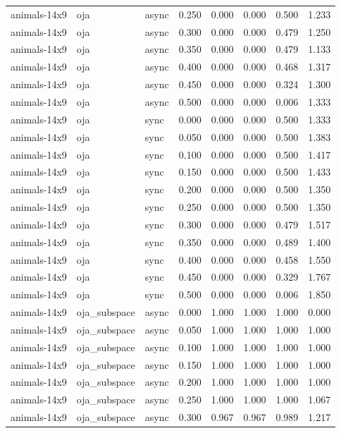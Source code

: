 \begin{tabular}{lllrrrrr}
animals-14x9 & oja & async & 0.250 & 0.000 & 0.000 & 0.500 & 1.233 \\
animals-14x9 & oja & async & 0.300 & 0.000 & 0.000 & 0.479 & 1.250 \\
animals-14x9 & oja & async & 0.350 & 0.000 & 0.000 & 0.479 & 1.133 \\
animals-14x9 & oja & async & 0.400 & 0.000 & 0.000 & 0.468 & 1.317 \\
animals-14x9 & oja & async & 0.450 & 0.000 & 0.000 & 0.324 & 1.300 \\
animals-14x9 & oja & async & 0.500 & 0.000 & 0.000 & 0.006 & 1.333 \\
animals-14x9 & oja & sync & 0.000 & 0.000 & 0.000 & 0.500 & 1.333 \\
animals-14x9 & oja & sync & 0.050 & 0.000 & 0.000 & 0.500 & 1.383 \\
animals-14x9 & oja & sync & 0.100 & 0.000 & 0.000 & 0.500 & 1.417 \\
animals-14x9 & oja & sync & 0.150 & 0.000 & 0.000 & 0.500 & 1.433 \\
animals-14x9 & oja & sync & 0.200 & 0.000 & 0.000 & 0.500 & 1.350 \\
animals-14x9 & oja & sync & 0.250 & 0.000 & 0.000 & 0.500 & 1.350 \\
animals-14x9 & oja & sync & 0.300 & 0.000 & 0.000 & 0.479 & 1.517 \\
animals-14x9 & oja & sync & 0.350 & 0.000 & 0.000 & 0.489 & 1.400 \\
animals-14x9 & oja & sync & 0.400 & 0.000 & 0.000 & 0.458 & 1.550 \\
animals-14x9 & oja & sync & 0.450 & 0.000 & 0.000 & 0.329 & 1.767 \\
animals-14x9 & oja & sync & 0.500 & 0.000 & 0.000 & 0.006 & 1.850 \\
animals-14x9 & oja\_subspace & async & 0.000 & 1.000 & 1.000 & 1.000 & 0.000 \\
animals-14x9 & oja\_subspace & async & 0.050 & 1.000 & 1.000 & 1.000 & 1.000 \\
animals-14x9 & oja\_subspace & async & 0.100 & 1.000 & 1.000 & 1.000 & 1.000 \\
animals-14x9 & oja\_subspace & async & 0.150 & 1.000 & 1.000 & 1.000 & 1.000 \\
animals-14x9 & oja\_subspace & async & 0.200 & 1.000 & 1.000 & 1.000 & 1.000 \\
animals-14x9 & oja\_subspace & async & 0.250 & 1.000 & 1.000 & 1.000 & 1.067 \\
animals-14x9 & oja\_subspace & async & 0.300 & 0.967 & 0.967 & 0.989 & 1.217 \\

\end{tabular}
